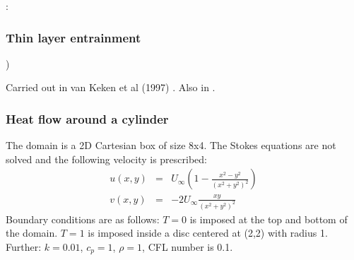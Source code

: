 \Literature: \cite{taie87}

\subsubsection{Thin layer entrainment} \label{sec:tlentr})



Carried out in van Keken et al (1997) \cite{vaks97}. Also in \cite{trlb20}.



\subsubsection{Heat flow around a cylinder} \label{sec:hfcyl}

The domain is a 2D Cartesian box of size 8x4.
The Stokes equations are not solved and the following velocity is prescribed:
\begin{eqnarray}
u(x,y)&=& U_\infty \left(  1-\frac{x^2-y^2}{(x^2+y^2)^2}  \right) \\
v(x,y)&=& -2U_\infty \frac{xy}{(x^2+y^2)^2}
\end{eqnarray}
Boundary conditions are as follows:
$T=0$ is imposed at the top and bottom of the domain. 
$T=1$ is imposed inside a disc centered at (2,2) with radius 1.  
Further: $k=0.01$, $c_p=1$, $\rho=1$, CFL number is 0.1.

